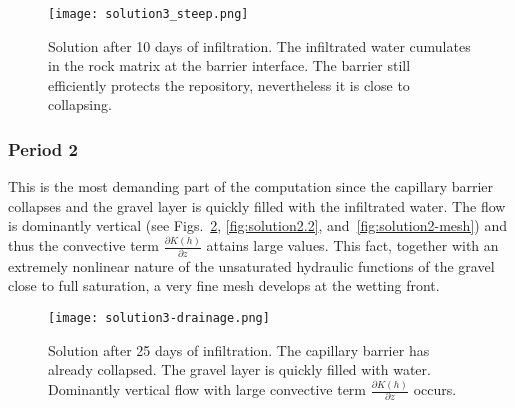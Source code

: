 \documentclass[final,3p,times,twocolumn]{elsarticle}
\begin{document}
\begin{figure}[!htb]
\begin{center}
\texttt{[image: solution3\_steep.png]}
\end{center}
\vspace{-4mm}
\caption{Solution after 10 days of infiltration. The infiltrated water cumulates in the rock matrix at the barrier interface. The barrier still efficiently protects the repository, nevertheless it is close to collapsing.}
\label{fig:solution1.2}
\vspace{-4.5mm}
\end{figure}



\subsubsection{Period 2}
This is the most demanding part of the computation since the capillary barrier collapses 
and the gravel layer is quickly filled with the infiltrated water. The flow is dominantly 
vertical (see Figs.~\ref{fig:solution2.1}, \ref{fig:solution2.2}, and~\ref{fig:solution2-mesh}) and thus the convective 
term $\frac{\partial K(h)}{\partial z}$ attains large values. This fact, together with an 
extremely nonlinear nature of the unsaturated 
hydraulic functions of the gravel close to full saturation,
a very fine mesh develops at the wetting front.

\begin{figure}[!ht]
\begin{center}
\texttt{[image: solution3-drainage.png]}
\end{center}
\vspace{-4mm}
\caption{Solution after 25 days of infiltration. The capillary barrier has 
already collapsed. The gravel layer is quickly filled with water. Dominantly vertical flow with 
large convective term $\frac{\partial K(h)}{\partial z}$ occurs.}
\label{fig:solution2.1}
\end{figure}
\end{document}
